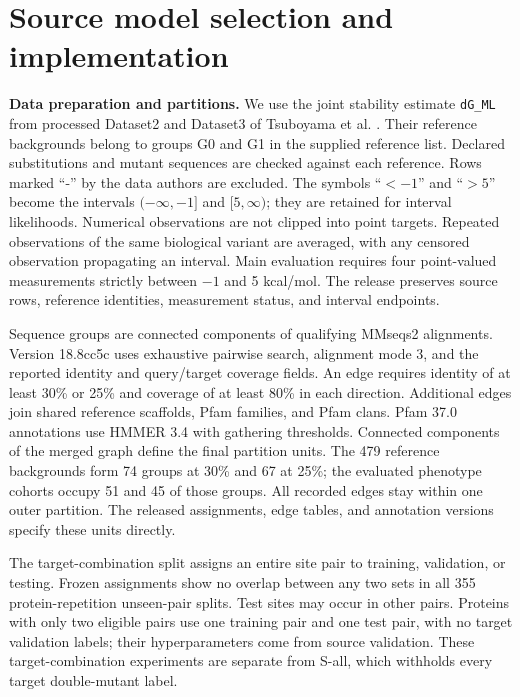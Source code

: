 \documentclass{llncs}
\begin{document}
\section{Source model selection and implementation}
\label{app:training}

\noindent\textbf{Data preparation and partitions.} We use the joint stability estimate \texttt{dG\_ML} from processed Dataset2 and Dataset3 of Tsuboyama et al. \citep{tsuboyama2023}. Their reference backgrounds belong to groups G0 and G1 in the supplied reference list. Declared substitutions and mutant sequences are checked against each reference. Rows marked ``-'' by the data authors are excluded. The symbols ``$<-1$'' and ``$>5$'' become the intervals $(-\infty,-1]$ and $[5,\infty)$; they are retained for interval likelihoods. Numerical observations are not clipped into point targets. Repeated observations of the same biological variant are averaged, with any censored observation propagating an interval. Main evaluation requires four point-valued measurements strictly between $-1$ and 5 kcal/mol. The release preserves source rows, reference identities, measurement status, and interval endpoints.

Sequence groups are connected components of qualifying MMseqs2 alignments. Version 18.8cc5c uses exhaustive pairwise search, alignment mode 3, and the reported identity and query/target coverage fields. An edge requires identity of at least 30\% or 25\% and coverage of at least 80\% in each direction. Additional edges join shared reference scaffolds, Pfam families, and Pfam clans. Pfam 37.0 annotations use HMMER 3.4 with gathering thresholds. Connected components of the merged graph define the final partition units. The 479 reference backgrounds form 74 groups at 30\% and 67 at 25\%; the evaluated phenotype cohorts occupy 51 and 45 of those groups. All recorded edges stay within one outer partition. The released assignments, edge tables, and annotation versions specify these units directly.

The target-combination split assigns an entire site pair to training, validation, or testing. Frozen assignments show no overlap between any two sets in all 355 protein-repetition unseen-pair splits. Test sites may occur in other pairs. Proteins with only two eligible pairs use one training pair and one test pair, with no target validation labels; their hyperparameters come from source validation. These target-combination experiments are separate from S-all, which withholds every target double-mutant label.
\end{document}
